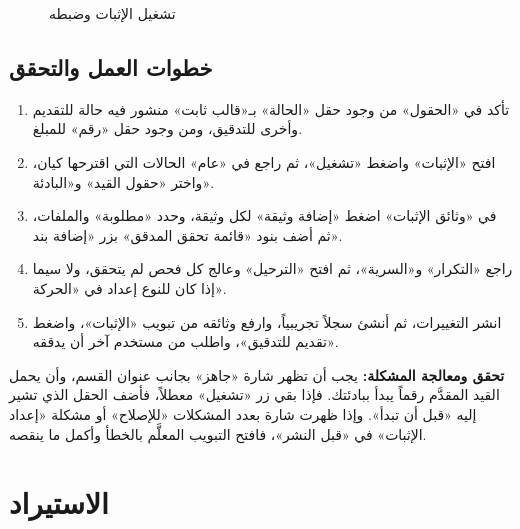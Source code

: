 \begin{figure}[H]
\centering
{}
\rclegend
\caption{تشغيل الإثبات وضبطه}
\label{fig:builder-evidence-flow}
\end{figure}

\subsection{خطوات العمل والتحقق}
\begin{enumerate}
\item تأكد في «الحقول» من وجود حقل «الحالة» بـ«قالب ثابت» منشور فيه حالة للتقديم وأخرى للتدقيق، ومن وجود حقل «رقم» للمبلغ.
\item افتح «الإثبات» واضغط «تشغيل»، ثم راجع في «عام» الحالات التي اقترحها كيان، واختر «حقول القيد» و«البادئة».
\item في «وثائق الإثبات» اضغط «إضافة وثيقة» لكل وثيقة، وحدد «مطلوبة» والملفات، ثم أضف بنود «قائمة تحقق المدقق» بزر «إضافة بند».
\item راجع «التكرار» و«السرية»، ثم افتح «الترحيل» وعالج كل فحص لم يتحقق، ولا سيما إذا كان للنوع إعداد في «الحركة».
\item انشر التغييرات، ثم أنشئ سجلاً تجريبياً، وارفع وثائقه من تبويب «الإثبات»، واضغط «تقديم للتدقيق»، واطلب من مستخدم آخر أن يدققه.
\end{enumerate}

\textbf{تحقق ومعالجة المشكلة:} يجب أن تظهر شارة «جاهز» بجانب عنوان القسم، وأن يحمل القيد المقدَّم رقماً يبدأ ببادئتك. فإذا بقي زر «تشغيل» معطلاً، فأضف الحقل الذي تشير إليه «قبل أن تبدأ». وإذا ظهرت شارة بعدد المشكلات «للإصلاح» أو مشكلة «إعداد الإثبات» في «قبل النشر»، فافتح التبويب المعلَّم بالخطأ وأكمل ما ينقصه.

\clearpage
\section{الاستيراد}
\label{sec:builder-feature-import}

